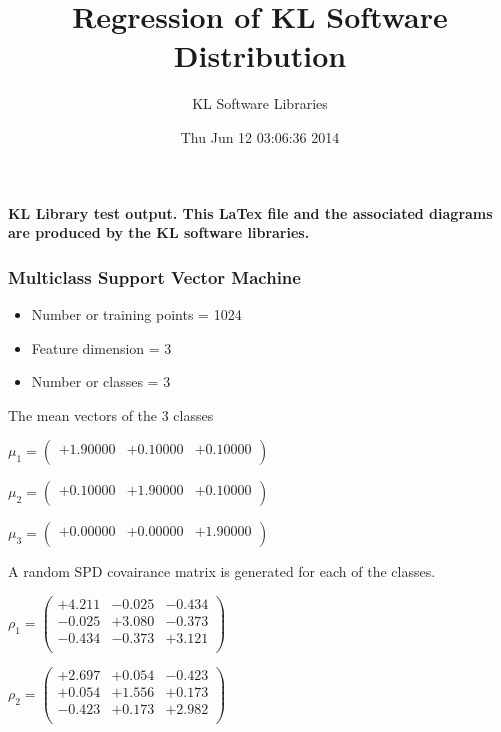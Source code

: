 \documentclass[9pt]{article}
\theoremstyle{plain}
\theoremstyle{definition}
\theoremstyle{remark}
\numberwithin{equation}{section}
\begin{document}
\title{Regression of KL Software Distribution   }
\author{KL Software Libraries}
\date{Thu Jun 12 03:06:36 2014
}
\maketitle
\textbf{ KL Library test output.  This LaTex file and the associated diagrams are produced by the KL software libraries.}
\subsubsection{Multiclass Support Vector Machine }
\begin{itemize}
\item Number or training points = 1024
\item Feature dimension = 3
\item Number or classes = 3
\end{itemize}
{The mean vectors of the 3 classes}

$\mu_1 = \left(
\begin{array}{
ccc}
+1.90000 & +0.10000 & +0.10000 \\
\end{array}
\right)$ \newline 

$\mu_2 = \left(
\begin{array}{
ccc}
+0.10000 & +1.90000 & +0.10000 \\
\end{array}
\right)$ \newline 

$\mu_3 = \left(
\begin{array}{
ccc}
+0.00000 & +0.00000 & +1.90000 \\
\end{array}
\right)$ \newline 

A random SPD covairance matrix is generated for each of the classes.\newline

$\rho_1 = \left(
\begin{array}{
ccc}
+4.211 & -0.025 & -0.434 \\
-0.025 & +3.080 & -0.373 \\
-0.434 & -0.373 & +3.121 \\
\end{array}
\right)$ \newline 

$\rho_2 = \left(
\begin{array}{
ccc}
+2.697 & +0.054 & -0.423 \\
+0.054 & +1.556 & +0.173 \\
-0.423 & +0.173 & +2.982 \\
\end{array}
\right)$ \newline 
\end{document}

